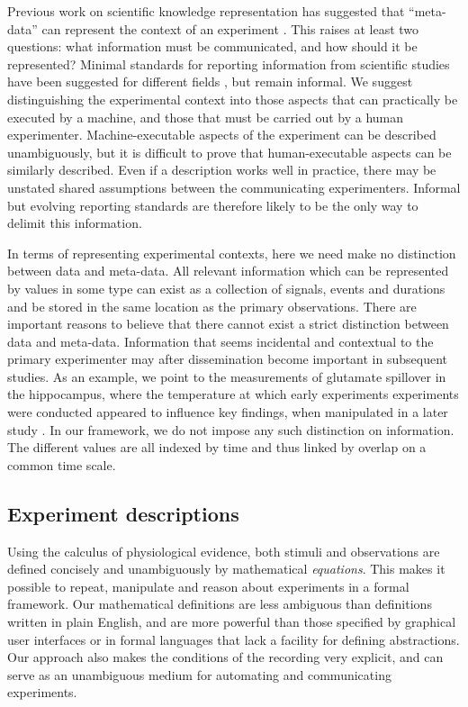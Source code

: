 Previous work on scientific knowledge representation has suggested
that ``meta-data'' can represent the context of an experiment
\citep{Bower2009}. This raises at least two questions: what
information must be communicated, and how should it be represented?
Minimal standards for reporting information from scientific studies
have been suggested for different fields
\citep{Taylor2007,Gibson2008}, but remain informal. We suggest
distinguishing the experimental context into those aspects that can
practically be executed by a machine, and those that must be carried
out by a human experimenter. Machine-executable aspects of the
experiment can be described unambiguously, but it is difficult to prove
that human-executable aspects can be similarly described. Even if a
description works well in practice, there may be unstated shared assumptions
between the communicating experimenters. Informal but evolving reporting
standards are therefore likely to be the only way to delimit this information.

In terms of representing experimental contexts, here we need make no
distinction between data and meta-data. All relevant information which
can be represented by values in some type can exist as a collection of
signals, events and durations and be stored in the same location as
the primary observations. There are important reasons to believe that
there cannot exist a strict distinction between data and
meta-data. Information that seems incidental and contextual to the
primary experimenter may after dissemination become important in
subsequent studies. As an example, we point to the measurements of
glutamate spillover in the hippocampus, where the temperature at which
early experiments \citep{Kullmann1996} experiments were conducted
appeared to influence key findings, when manipulated in a later
study \citep{Asztely1997}.  In our framework, we do not impose any
such distinction on information. The different values are all indexed
by time and thus linked by overlap on a common time scale.

\subsection*{Experiment descriptions}

Using the calculus of physiological evidence, both stimuli and
observations are defined concisely and unambiguously by mathematical
\emph{equations}. This makes it possible to repeat, manipulate and
reason about experiments in a formal framework. Our mathematical
definitions are less ambiguous than definitions written in plain
English, and are more powerful than those specified by graphical user
interfaces or in formal languages that lack a facility for defining
abstractions. Our approach also makes the conditions of the recording
very explicit, and can serve as an unambiguous medium for automating
and communicating experiments. 

